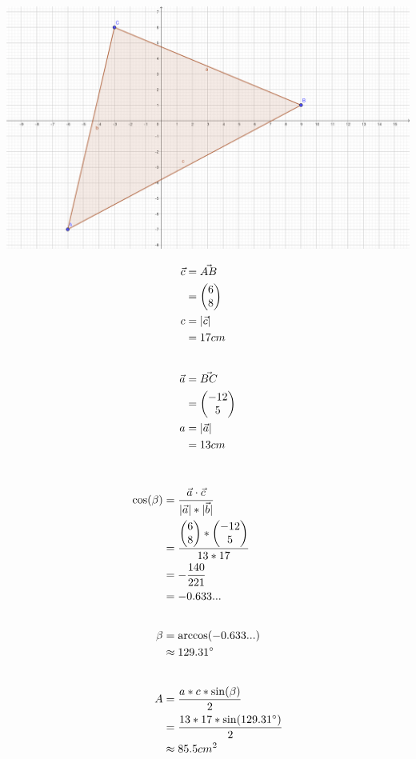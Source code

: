 \documentclass{article}
\begin{document}
\def\BC{\begin{pmatrix}
       -12 \\
       5 \\
    \end{pmatrix}}

\def\cosval{-0.633...}
\def\cosang{129.31}
\def\cosanginv{\pgfmathparse{180 - \cosang}\pgfmathresult}
\def\sinofang{\pgfmathparse{sin(\cosang)}\pgfmathresult}
\def\sinofanginv{\pgfmathparse{sin(180 - \cosang)}\pgfmathresult}

\includegraphics[width=\linewidth]{images/8-29-1.png}

\begin{align*}
    \vec{c} &= \vec{AB} \\ 
    &= \AB \\
    c &= |\vec{c}|  \\
    &= 17cm \\[20pt]
    \vec{a} &= \vec{BC} \\
    &= \BC \\
    a &= |\vec{a}| \\
    &= 13cm \\[20pt]
\end{align*}

\begin{align*}
    \cos({\beta}) &= \frac{\vec{a} \cdot \vec{c}}{|\vec{a}| * |\vec{b}|} \\
    &= \frac{\AB * \BC}{13 * 17}  \\
    &= -\frac{140}{221} \\
    &= \cosval \\[20pt]
    \beta &= \arccos(\cosval) \\
    &\approx \cosang^\circ \\[20pt]
    A &= \frac{a * c * \sin({\beta})}{2} \\
    &= \frac{13 * 17 * \sin({\cosang^\circ})}{2} \\
    &\approx 85.5cm^2
\end{align*}
\end{document}
